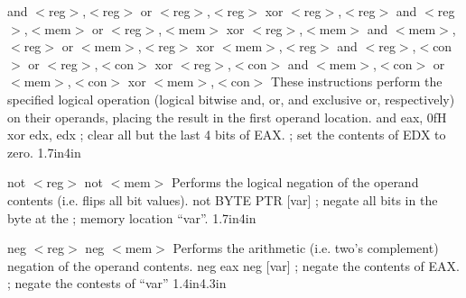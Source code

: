 {and $<$reg$>$,$<$reg$>$ \hspace{0.25in} or $<$reg$>$,$<$reg$>$ \hspace{0.25in} xor $<$reg$>$,$<$reg$>$ \newline
and $<$reg$>$,$<$mem$>$ \hspace{0.25in} or $<$reg$>$,$<$mem$>$ \hspace{0.25in} xor $<$reg$>$,$<$mem$>$ \newline
and $<$mem$>$,$<$reg$>$ \hspace{0.25in} or $<$mem$>$,$<$reg$>$ \hspace{0.25in} xor $<$mem$>$,$<$reg$>$ \newline
and $<$reg$>$,$<$con$>$ \hspace{0.25in} or $<$reg$>$,$<$con$>$ \hspace{0.25in} xor $<$reg$>$,$<$con$>$ \newline
and $<$mem$>$,$<$con$>$ \hspace{0.25in} or $<$mem$>$,$<$con$>$ \hspace{0.25in} xor $<$mem$>$,$<$con$>$}
{These instructions perform the specified logical operation (logical
bitwise and, or, and exclusive or, respectively) on their operands,
placing the result in the first operand location.}
{and eax, 0fH \newline xor edx, edx}
{; clear all but the last 4 bits of EAX. \newline ; set the contents of EDX to zero.}
{1.7in}{4in}

{not $<$reg$>$ \newline not $<$mem$>$}
{Performs the logical negation of the operand contents (i.e. flips all bit values).}
{not BYTE PTR [var]}
{; negate all bits in the byte at the \newline ; memory location ``var''.}
{1.7in}{4in}

{neg $<$reg$>$ \newline neg $<$mem$>$}
{Performs the arithmetic (i.e. two's complement) negation of the operand contents.}
{neg eax \newline neg [var]}
{; negate the contents of EAX. \newline ; negate the contests of ``var''}
{1.4in}{4.3in}

